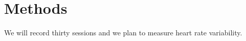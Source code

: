 \documentclass{article}
\begin{document}
\section{Methods}
We will record thirty sessions and we plan to measure heart rate variability.
\end{document}

